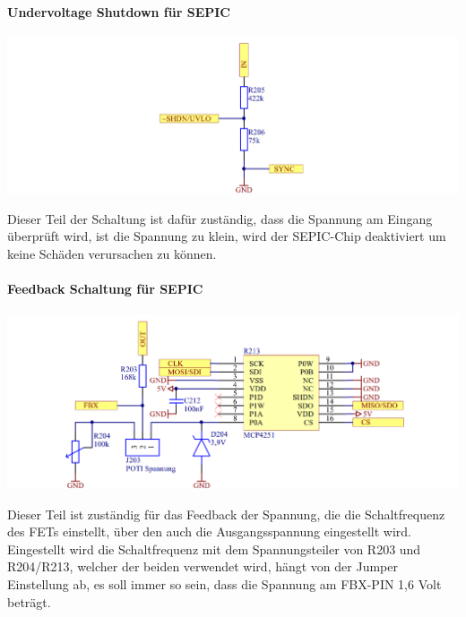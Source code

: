 \documentclass[paper=a4, 12pt]{scrreprt}
\begin{document}
			\paragraph{Undervoltage Shutdown für SEPIC}\hfill \break
			\begin{adjustbox}{center,caption={Undervoltage Shutdown Schaltung für LT3757},label={fig:uvlo},nofloat=figure,vspace=\bigskipamount}
				\includegraphics[width=\textwidth]{img/Undervolteage_Shutdown_SEPIC.PNG}
			\end{adjustbox}
			Dieser Teil der Schaltung ist dafür zuständig, dass die Spannung am Eingang überprüft wird, ist die Spannung zu klein, wird der SEPIC-Chip deaktiviert um keine Schäden verursachen zu können.
			\pagebreak
			\paragraph{Feedback Schaltung für SEPIC}\hfill \break
			\begin{adjustbox}{center,caption={Feedback Schaltung für SEPIC},label={fig:feedback},nofloat=figure,vspace=\bigskipamount}
				\includegraphics[width=\textwidth]{img/Feedback_SEPIC.PNG}
			\end{adjustbox}
			Dieser Teil ist zuständig für das Feedback der Spannung, die die Schaltfrequenz des FETs einstellt, über den auch die Ausgangsspannung eingestellt wird. Eingestellt wird die Schaltfrequenz mit dem Spannungsteiler von R203 und R204/R213, welcher der beiden verwendet wird, hängt von der Jumper Einstellung ab, es soll immer so sein, dass die Spannung am FBX-PIN 1,6 Volt beträgt.
			
\end{document}
